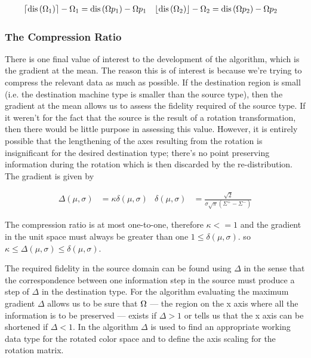 \begin{equation}
\begin{aligned}
\left\lceil\text{dis}\left(\Omega _1\right)\right\rceil-\Omega _1 & =\text{dis}\left(\Omega p _1\right)- \Omega p _1 &
\left\lfloor\text{dis}\left(\Omega _2\right)\right\rfloor-\Omega _2 & =\text{dis}\left(\Omega p _2\right)- \Omega p _2 
\end{aligned}
\end{equation}

\subsubsection{The Compression Ratio}

There is one final value of interest to the development of the algorithm, which is the gradient at the mean. The reason this is of interest is because we're trying to compress the relevant data as much as possible. If the destination region is small (i.e. the destination machine type is smaller than the source type), then the gradient at the mean allows us to assess the fidelity required of the source type. If it weren't for the fact that the source is the result of a rotation transformation, then there would be little purpose in assessing this value. However, it is entirely possible that the lengthening of the axes resulting from the rotation is insignificant for the desired destination type; there's no point preserving information during the rotation which is then discarded by the re-distribution. The gradient is given by

\begin{equation}\label{eq:gradient}
\begin{aligned}
\Delta(\mu,\sigma) &= \kappa  \delta(\mu,\sigma)  & \delta(\mu,\sigma)  &= \frac{ \sqrt{2} }{ \sigma \sqrt{\pi }  \left(\Sigma^+-\Sigma^-\right)}
\end{aligned}
\end{equation}

The compression ratio is at most one-to-one, therefore $\kappa <=1$ and the gradient in the unit space must always be greater than one $1 \le \delta(\mu,\sigma)$. so $ \kappa \le \Delta(\mu,\sigma) \le \delta(\mu,\sigma)$.

The required fidelity in the source domain can be found using $ \Delta$ in the sense that the correspondence between one information step in the source must produce a step of $\Delta$ in the destination type. For the algorithm evaluating the maximum gradient $\Delta$ allows us to be sure that  $\Omega$ --- the region on the x axis where all the information is to be preserved --- exists if $\Delta >1$ or tells us that the x axis can be shortened if  $\Delta < 1$. In the algorithm $\Delta$ is used to find an appropriate working data type for the rotated color space and to define the axis scaling for the rotation matrix.


